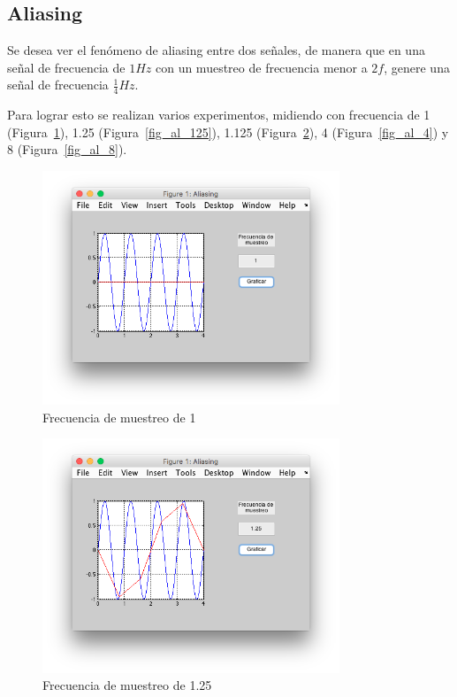 \documentclass[comsoc, journal]{IEEEtran}
\begin{document}
\subsection{Aliasing}
Se desea ver el fenómeno de aliasing entre dos señales, de manera que en una señal de frecuencia de $1Hz$ con un muestreo de frecuencia menor a $2f$, genere una señal de frecuencia $\frac{1}{4}Hz$.

Para lograr esto se realizan varios experimentos, midiendo con frecuencia de 1 (Figura~\ref{fig_al_1}), 1.25 (Figura~\ref{fig_al_125}), 1.125 (Figura~\ref{fig_al_25}), 4 (Figura~\ref{fig_al_4}) y 8 (Figura~\ref{fig_al_8}).

\begin{figure}[!t]
\centering
\includegraphics[width=3.5in]{imgs/aliasing_1.png}
\caption{Frecuencia de muestreo de 1}
\label{fig_al_1}
\end{figure}

\begin{figure}[!t]
\centering
\includegraphics[width=3.5in]{imgs/aliasing_25.png}
\caption{Frecuencia de muestreo de 1.25}
\label{fig_al_25}
\end{figure}
\end{document}
